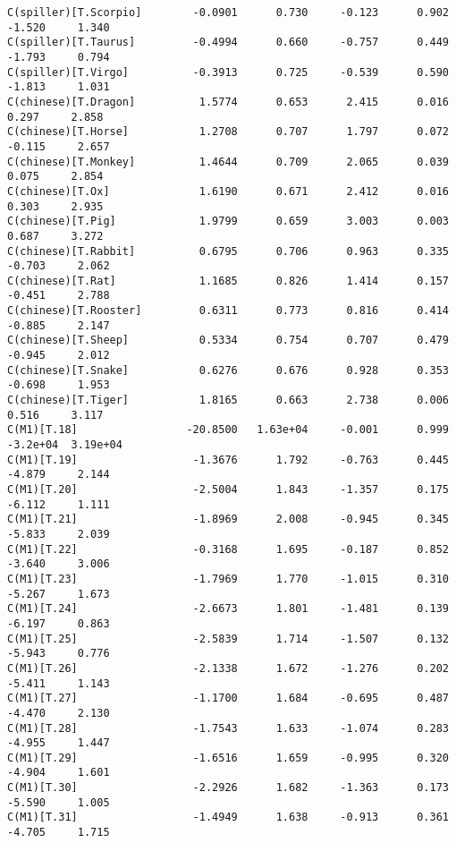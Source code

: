 \documentclass[12pt,fleqn]{article}\usepackage{../common}
\begin{document}
\begin{verbatim}
C(spiller)[T.Scorpio]        -0.0901      0.730     -0.123      0.902        -1.520     1.340
C(spiller)[T.Taurus]         -0.4994      0.660     -0.757      0.449        -1.793     0.794
C(spiller)[T.Virgo]          -0.3913      0.725     -0.539      0.590        -1.813     1.031
C(chinese)[T.Dragon]          1.5774      0.653      2.415      0.016         0.297     2.858
C(chinese)[T.Horse]           1.2708      0.707      1.797      0.072        -0.115     2.657
C(chinese)[T.Monkey]          1.4644      0.709      2.065      0.039         0.075     2.854
C(chinese)[T.Ox]              1.6190      0.671      2.412      0.016         0.303     2.935
C(chinese)[T.Pig]             1.9799      0.659      3.003      0.003         0.687     3.272
C(chinese)[T.Rabbit]          0.6795      0.706      0.963      0.335        -0.703     2.062
C(chinese)[T.Rat]             1.1685      0.826      1.414      0.157        -0.451     2.788
C(chinese)[T.Rooster]         0.6311      0.773      0.816      0.414        -0.885     2.147
C(chinese)[T.Sheep]           0.5334      0.754      0.707      0.479        -0.945     2.012
C(chinese)[T.Snake]           0.6276      0.676      0.928      0.353        -0.698     1.953
C(chinese)[T.Tiger]           1.8165      0.663      2.738      0.006         0.516     3.117
C(M1)[T.18]                 -20.8500   1.63e+04     -0.001      0.999      -3.2e+04  3.19e+04
C(M1)[T.19]                  -1.3676      1.792     -0.763      0.445        -4.879     2.144
C(M1)[T.20]                  -2.5004      1.843     -1.357      0.175        -6.112     1.111
C(M1)[T.21]                  -1.8969      2.008     -0.945      0.345        -5.833     2.039
C(M1)[T.22]                  -0.3168      1.695     -0.187      0.852        -3.640     3.006
C(M1)[T.23]                  -1.7969      1.770     -1.015      0.310        -5.267     1.673
C(M1)[T.24]                  -2.6673      1.801     -1.481      0.139        -6.197     0.863
C(M1)[T.25]                  -2.5839      1.714     -1.507      0.132        -5.943     0.776
C(M1)[T.26]                  -2.1338      1.672     -1.276      0.202        -5.411     1.143
C(M1)[T.27]                  -1.1700      1.684     -0.695      0.487        -4.470     2.130
C(M1)[T.28]                  -1.7543      1.633     -1.074      0.283        -4.955     1.447
C(M1)[T.29]                  -1.6516      1.659     -0.995      0.320        -4.904     1.601
C(M1)[T.30]                  -2.2926      1.682     -1.363      0.173        -5.590     1.005
C(M1)[T.31]                  -1.4949      1.638     -0.913      0.361        -4.705     1.715

\end{verbatim}
\end{document}
